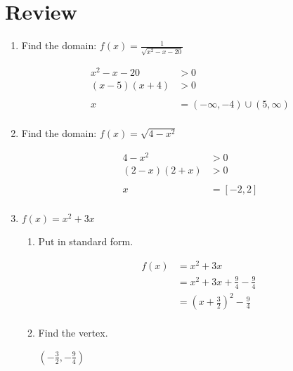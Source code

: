 \documentclass{exam}
\begin{document}
  \section{Review}
  \begin{enumerate}
    \item Find the domain: $f(x) = \frac{1}{\sqrt{x^2 - x - 20}}$
      \begin{solution}
        \begin{align*}
          x^2 - x - 20   &> 0 \\
          (x - 5)(x + 4) &> 0 \\
          \\
          x &= \left( -\infty, -4 \right) \cup \left( 5, \infty \right) \\
        \end{align*}
      \end{solution}

    \item Find the domain: $f(x) = \sqrt{4 - x^2}$
      \begin{solution}
        \begin{align*}
          4 - x^2 &> 0 \\
          (2 - x)(2 + x) &> 0 \\
          \\
          x &= [-2, 2] \\
        \end{align*}
      \end{solution}

    \item $f(x) = x^2 + 3x$ 
      \begin{enumerate}[a]
        \item Put in standard form.
          \begin{solution}
            \begin{align*}
              f(x) &= x^2 + 3x \\
              &= x^2 + 3x + \frac{9}{4} - \frac{9}{4} \\
              &= \left( x + \frac{3}{2} \right)^2 - \frac{9}{4} \\
            \end{align*}
          \end{solution}

        \item Find the vertex.
          \begin{solution}
            $ \left( -\frac{3}{2}, - \frac{9}{4} \right) $
          \end{solution}


\end{enumerate}
\end{enumerate}
\end{document}
